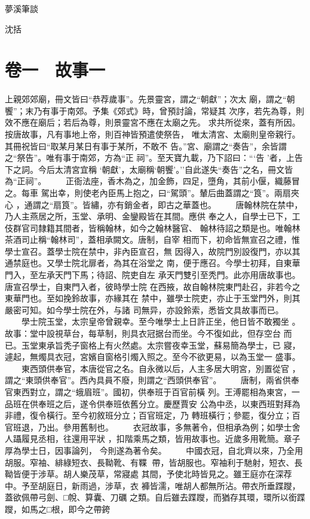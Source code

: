 \documentclass{ctexart}
\begin{document}
\vspace*{\fill}
\Huge
夢溪筆談

\bigskip

沈括
\vspace*{\fill}
\clearpage
\normalsize
\tableofcontents
\clearpage
\section{卷一　故事一}
\paragraph{}
上親郊郊廟，冊文皆曰``恭荐歲事''。先景靈宮，謂之``朝獻''；次太 廟，謂之``朝饗''；末乃有事于南郊。予集《郊式》時，曾預討論，常疑其 次序，若先為尊，則效不應在廟后；若后為尊，則景靈宮不應在太廟之先。 求共所從來，蓋有所因。按唐故事，凡有事地上帝，則百神皆預遣使祭告， 唯太清宮、太廟則皇帝親行。其冊祝皆曰``取某月某日有事于某所，不敢不 告。''宮、廟謂之``奏告''，余皆謂之``祭告''。唯有事于南郊，方為``正 祠''。至天寶九載，乃下詔曰：```告 '者，上告下之詞。今后太清宮宜稱 `朝獻'，太廟稱`朝饗'。''自此遂失``奏告''之名，冊文皆為``正祠''。 　　正衙法座，香木為之，加金飾，四足，墮角，其前小偃，織藤冒之。每車 駕出幸，則使老內臣馬上抱之，曰``駕頭''。輦后曲蓋謂之``筤''。兩扇夾心 ，通謂之``扇筤''。皆繡，亦有銷金者，即古之華蓋也。 　　唐翰林院在禁中，乃人主燕居之所，玉堂、承明、金鑾殿皆在其間。應供 奉之人，自學士已下，工伎群官司隸籍其間者，皆稱翰林，如今之翰林醫官、 翰林待詔之類是也。唯翰林茶酒司止稱``翰林司''，蓋相承闕文。唐制，自宰 相而下，初命皆無宣召之禮，惟學士宣召。蓋學士院在禁中，非內臣宣召，無 因得入，故院門別設復門，亦以其通禁庭也。又學士院北扉者，為其在浴堂之 南，便于應召。今學士初拜，自東華門入，至左承天門下馬；待詔、院吏自左 承天門雙引至秃門。此亦用唐故事也。唐宣召學士，自東門入者，彼時學士院 在西掖，故自翰林院東門赴召，非若今之東華門也。至如挽鈴故事，亦緣其在 禁中，雖學士院吏，亦止于玉堂門外，則其嚴密可知。如今學士院在外，与諸 司無异，亦設鈴索，悉皆文具故事而已。 　　學士院玉堂，太宗皇帝曾親幸。至今唯學士上日許正坐，他日皆不敢獨坐 。故事：堂中設視草台，每草制，則具衣冠据台而坐。今不復如此，但存空台 而已。玉堂東承旨秃子窗格上有火然處。太宗嘗夜幸玉堂，蘇易簡為學士，已 寢，遽起，無燭具衣冠，宮嬪自窗格引燭入照之。至今不欲更易，以為玉堂一 盛事。 　　東西頭供奉官，本唐從官之名。自永微以后，人主多居大明宮，別置從官 ，謂之``東頭供奉官''。西內具員不廢，則謂之``西頭供奉官''。 　　唐制，兩省供奉官東西對立，謂之``蛾眉班''。國初，供奉班于百官前橫 列。王溥罷相為東宮，一品班在供奉班之后，遂令供奉班依舊分立。慶歷賈安 公為中丞，以東西班對拜為非禮，復令橫行。至今初敘班分立；百官班定，乃 轉班橫行；參罷，復分立；百官班退，乃出。參用舊制也。 　　衣冠故事，多無著令，但相承為例；如學士舍人躡履見丞相，往還用平狀 ，扣階乘馬之類，皆用故事也。近歲多用靴簡。章子厚為學士日，因事論列， 今則遂為著令矣。 　　中國衣冠，自北齊以來，乃全用胡服。窄袖、緋綠短衣、長靿靴、有鞢 帶，皆胡服也。窄袖利于馳射，短衣、長靿皆便于涉草。胡人樂茂草，常寢處 其間，予使北時皆見之。雖王庭亦在深荐中。予至胡庭日，新雨過，涉草，衣 褲皆濡，唯胡人都無所沾。帶衣所垂蹀躞，蓋欲佩帶弓劍、□帨、算囊、刀礪 之類。自后雖去蹀躞，而猶存其環，環所以銜蹀躞，如馬之□根，即今之帶銙 
\end{document}
